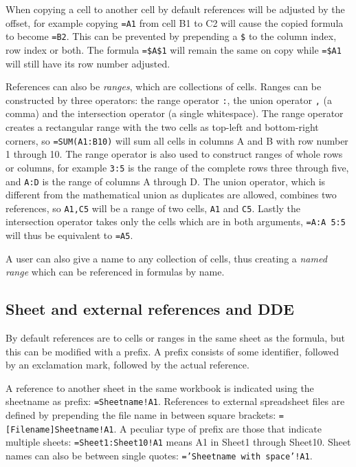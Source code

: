 \documentclass[conference]{IEEEtran}
\begin{document}
When copying a cell to another cell by default references will be adjusted by the offset, for example copying \texttt{=A1} from cell B1 to C2 will cause the copied formula to become \texttt{=B2}.
This can be prevented by prepending a \texttt{\$} to the column index, row index or both.
The formula \texttt{=\$A\$1} will remain the same on copy while \texttt{=\$A1} will still have its row number adjusted.

References can also be \emph{ranges}, which are collections of cells.
Ranges can be constructed by three operators: the range operator \texttt{:}, the union operator \texttt{,} (a comma) and the intersection operator \texttt{} (a single whitespace).
The range operator creates a rectangular range with the two cells as top-left and bottom-right corners, so \texttt{=SUM(A1:B10)} will sum all cells in columns A and B with row number 1 through 10.
The range operator is also used to construct ranges of whole rows or columns, for example \texttt{3:5} is the range of the complete rows three through five, and \texttt{A:D} is the range of columns A through D.
The union operator, which is different from the mathematical union as duplicates are allowed, combines two references, so \texttt{A1,C5} will be a range of two cells, \texttt{A1} and \texttt{C5}.
Lastly the intersection operator takes only the cells which are in both arguments, \texttt{=A:A 5:5} will thus be equivalent to \texttt{=A5}.

A user can also give a name to any collection of cells, thus creating a \emph{named range} which can be referenced in formulas by name.

\subsection{Sheet and external references and DDE}
\label{subsection:ExternalRefsDDE}

By default references are to cells or ranges in the same sheet as the formula, but this can be modified with a prefix. A prefix consists of some identifier, followed by an exclamation mark, followed by the actual reference.

A reference to another sheet in the same workbook is indicated using the sheetname as prefix: \texttt{=Sheetname!A1}. References to external spreadsheet files are defined by prepending the file name in between square brackets: \texttt{=[Filename]Sheetname!A1}.
A peculiar type of prefix are those that indicate multiple sheets: \texttt{=Sheet1:Sheet10!A1} means A1 in Sheet1 through Sheet10.
Sheet names can also be between single quotes: \texttt{='Sheetname with space'!A1}. 
\end{document}
